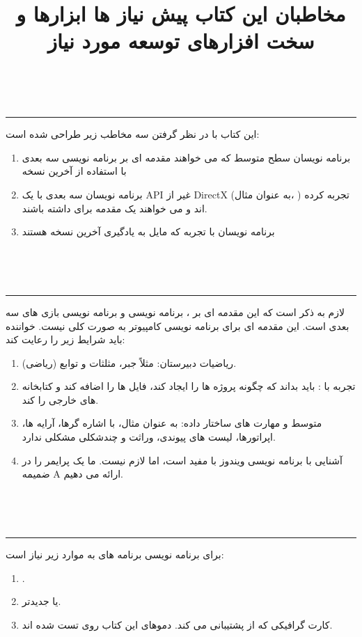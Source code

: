 \title{
    \LARGE
    \textbf{مخاطبان این کتاب}
}
\\ \rule{\textwidth}{0.5pt}
{  \large
این کتاب با در نظر گرفتن سه مخاطب زیر طراحی شده است:
    \begin{enumerate}
        \item {برنامه نویسان سطح متوسط  که می خواهند مقدمه ای بر برنامه نویسی سه بعدی با استفاده از آخرین نسخه }
        \item {برنامه نویسان سه بعدی با یک API غیر از DirectX (به عنوان مثال، ) تجربه کرده اند و می خواهند یک مقدمه برای  داشته باشند.}
        \item {برنامه نویسان با تجربه  که مایل به یادگیری آخرین نسخه  هستند}
    \end{enumerate}
}
\\[25pt]

\title{
    \LARGE
    \textbf{پیش نیاز ها}
}
\\ \rule{\textwidth}{0.5pt}
{  \large
لازم به ذکر است که این مقدمه ای بر ، برنامه نویسی  و برنامه نویسی بازی های سه بعدی است. این مقدمه ای برای برنامه نویسی کامپیوتر به صورت کلی نیست. خواننده باید شرایط زیر را رعایت کند:
    \begin{enumerate}
        \item {ریاضیات دبیرستان: مثلاً جبر، مثلثات و توابع (ریاضی).}
        \item {تجربه با : باید بداند که چگونه پروژه ها را ایجاد کند، فایل ها را اضافه کند و کتابخانه های خارجی را  کند.}
        \item { متوسط و مهارت های ساختار داده: به عنوان مثال، با اشاره گرها، آرایه ها،  اپراتورها، لیست های پیوندی، وراثت و چندشکلی مشکلی ندارد.}
        \item {آشنایی با برنامه نویسی ویندوز با  مفید است، اما لازم نیست. ما یک پرایمر  را در ضمیمه A ارائه می دهیم.}
    \end{enumerate}
}

\\[25pt]
\title{
    \LARGE
    \textbf{ابزارها و سخت افزارهای توسعه مورد نیاز}
}
\\ \rule{\textwidth}{0.5pt}
{  \large
برای برنامه نویسی برنامه های  به موارد زیر نیاز است:
    \begin{enumerate}
        \item {.}
        \item { یا جدیدتر.}
        \item {کارت گرافیکی که از  پشتیبانی می کند. دموهای این کتاب روی  تست شده اند.}
    \end{enumerate}
}


\newpage